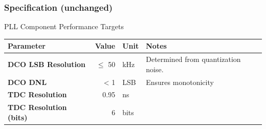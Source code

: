 \documentclass[t, screen, aspectratio=43]{beamer}
\begin{document}
\begin{frame}
	\frametitle{Specification (unchanged)}
	\begin{block}{PLL Component Performance Targets}
		\scriptsize
		\begin{table}[h!]
			\centering
			\def\arraystretch{1.5}		
			\setlength\arrayrulewidth{0.75pt}
			\setlength{\tabcolsep}{1em} %
			\begin{tabular}{|l|r|l|l|}
				\hline 
				\rule[-1ex]{0pt}{2.5ex} \cellcolor{gray!40}\textbf{Parameter} & \cellcolor{gray!40}\textbf{Value} & \cellcolor{gray!40}\textbf{Unit }& \cellcolor{gray!40}\textbf{Notes}\\ 
				\hline 
				\rule[-1ex]{0pt}{2.5ex} \textbf{DCO LSB Resolution}  & $\leq$ 50  & kHz & Determined from quantization noise.\\ 
				\hline 
				\rule[-1ex]{0pt}{2.5ex} \textbf{DCO DNL} & < 1 & LSB & Ensures monotonicity \\ 
				\hline 
				\rule[-1ex]{0pt}{2.5ex} \textbf{TDC Resolution} & 0.95  & ns & \\ 
				\hline 
				\rule[-1ex]{0pt}{2.5ex} \textbf{TDC Resolution (bits)} &  6 &bits & \\ 
				\hline 
			\end{tabular} 
		\end{table}   
	\end{block}    
\end{frame}

\end{document}
